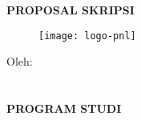 \begin{center}

\large
\MakeUppercase{\textbf{proposal skripsi}}

\vfill
\begin{figure}[h]
\centering
\texttt{[image: logo-pnl]}
\end{figure}

\vfill
\normalsize
\MakeUppercase{\textbf{\judulId}}

\vfill
Oleh: \\
\MakeUppercase{\mahasiswa} \\
\nim \\

\vfill
\MakeUppercase{
\textbf{
program studi \prodi \\
\jurusan \\
\institusi \\
\the\year{}
}}

\end{center}
